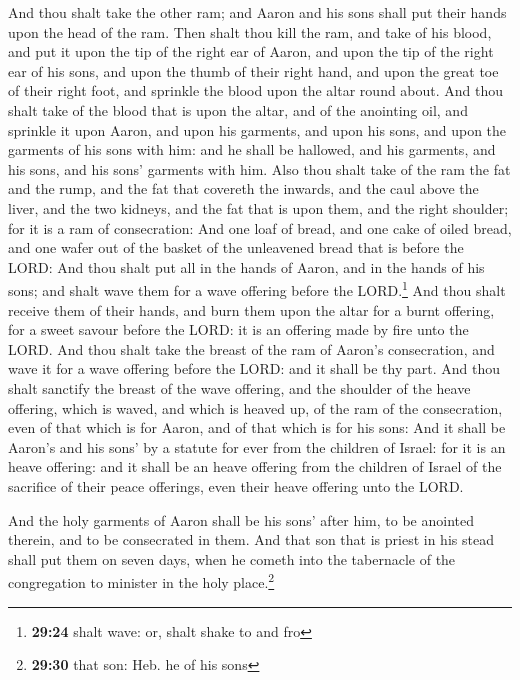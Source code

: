  And thou shalt take the other ram; and Aaron and his
sons shall put their hands upon the head of the ram. 
Then shalt thou kill the ram, and take of his blood, and put it upon the
tip of the right ear of Aaron, and upon the tip of the right ear of his
sons, and upon the thumb of their right hand, and upon the great toe of
their right foot, and sprinkle the blood upon the altar round about.
 And thou shalt take of the blood that is upon the altar,
and of the anointing oil, and sprinkle it upon Aaron, and upon his
garments, and upon his sons, and upon the garments of his sons with him:
and he shall be hallowed, and his garments, and his sons, and his sons'
garments with him.  Also thou shalt take of the ram the
fat and the rump, and the fat that covereth the inwards, and the caul
above the liver, and the two kidneys, and the fat that is upon them, and
the right shoulder; for it is a ram of consecration:  And
one loaf of bread, and one cake of oiled bread, and one wafer out of the
basket of the unleavened bread that is before the LORD: 
And thou shalt put all in the hands of Aaron, and in the hands of his
sons; and shalt wave them for a wave offering before the
LORD.\footnote{\textbf{29:24} shalt wave: or, shalt shake to and fro}
 And thou shalt receive them of their hands, and burn
them upon the altar for a burnt offering, for a sweet savour before the
LORD: it is an offering made by fire unto the LORD.  And
thou shalt take the breast of the ram of Aaron's consecration, and wave
it for a wave offering before the LORD: and it shall be thy part.
 And thou shalt sanctify the breast of the wave offering,
and the shoulder of the heave offering, which is waved, and which is
heaved up, of the ram of the consecration, even of that which is for
Aaron, and of that which is for his sons:  And it shall
be Aaron's and his sons' by a statute for ever from the children of
Israel: for it is an heave offering: and it shall be an heave offering
from the children of Israel of the sacrifice of their peace offerings,
even their heave offering unto the LORD.

 And the holy garments of Aaron shall be his sons' after
him, to be anointed therein, and to be consecrated in them.
 And that son that is priest in his stead shall put them
on seven days, when he cometh into the tabernacle of the congregation to
minister in the holy place.\footnote{\textbf{29:30} that son: Heb. he of
  his sons}

